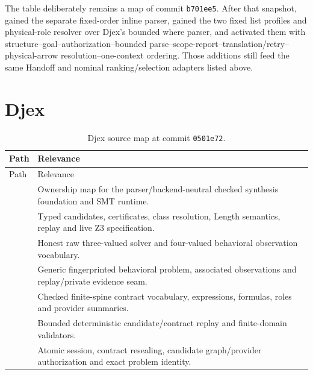 \documentclass[11pt,oneside]{report}
\newcommand{\code}[1]{\texttt{#1}}
\begin{document}
The table deliberately remains a map of commit \code{b701ee5}. After that
snapshot,  gained the separate
fixed-order inline parser,
 gained the two fixed list profiles and
physical-role resolver over Djex's bounded where parser, and
 activated them with structure--goal--authorization--bounded
parse--scope-report--translation/retry--physical-arrow
resolution--one-context ordering.
Those additions still feed the same Handoff and nominal ranking/selection
adapters listed above.

\section{Djex}

\begin{longtable}{@{}L{0.48\textwidth}L{0.46\textwidth}@{}}
\caption{Djex source map at commit \code{0501e72}.}\label{tab:djex-source-map}\\
\toprule
Path & Relevance \\
\midrule
\endfirsthead
\toprule
Path & Relevance \\
\midrule
\endhead
\bottomrule
\endfoot
{} & Ownership map for the parser/backend-neutral checked synthesis foundation and SMT runtime. \\
 & Typed candidates, certificates, class resolution, Length semantics, replay and live Z3 specification. \\
 & Honest raw three-valued solver and four-valued behavioral observation vocabulary. \\
 & Generic fingerprinted behavioral problem, associated observations and replay/private evidence seam. \\
 & Checked finite-spine contract vocabulary, expressions, formulas, roles and provider summaries. \\
 & Bounded deterministic candidate/contract replay and finite-domain validators. \\
 & Atomic session, contract resealing, candidate graph/provider authorization and exact problem identity. \\

\end{longtable}
\end{document}
